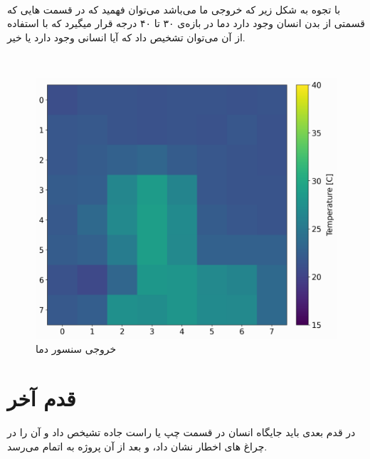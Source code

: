 \documentclass[12pt]{article}
\begin{document}
\\
 
 با تجوه به شکل زیر که خروجی ما می‌باشد می‌توان فهمید که در قسمت هایی که قسمتی از بدن انسان وجود دارد دما در بازه‌ی ۳۰ تا ۴۰ درجه قرار میگیرد که با استفاده از آن می‌توان تشخیص داد که آیا انسانی وجود دارد یا خیر.

\\
 
\begin{figure}[h]
	\begin{center}
		\includegraphics[width=.75\textwidth]{images/AMG8833_IR_cam_test.png}
	\end{center}
	\caption{خروجی سنسور دما}
\end{figure}

\newpage

\section{قدم آخر}

در قدم بعدی باید جایگاه انسان در قسمت چپ یا راست جاده تشیخص داد و آن را در چراغ های اخطار نشان داد، و بعد از آن پروژه به اتمام می‌رسد.
\end{document}
